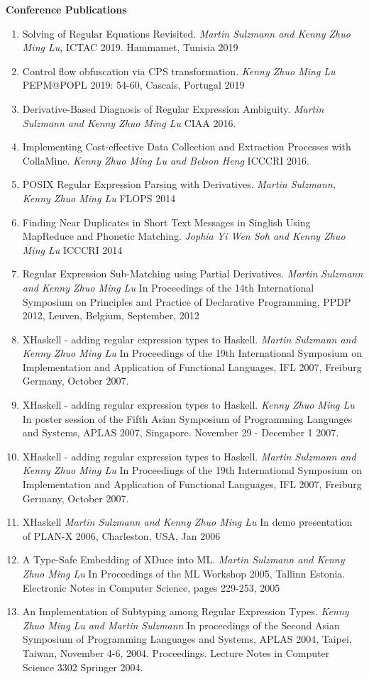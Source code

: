 \documentclass[margin,line]{res}
\begin{document}
\begin{resume}
{{\bf Conference Publications}
\begin{enumerate}
\item  Solving of Regular Equations Revisited. \textit{Martin Sulzmann
    and Kenny Zhuo Ming Lu}, ICTAC 2019. Hammamet, Tunisia 2019  
\item Control flow obfuscation via CPS transformation. \textit{Kenny
    Zhuo Ming Lu}  PEPM@POPL 2019: 54-60, Cascais, Portugal 2019 
\item Derivative-Based Diagnosis of Regular Expression
  Ambiguity. \textit{Martin Sulzmann and Kenny Zhuo Ming Lu} CIAA 2016.
\item Implementing Cost-effective Data Collection and Extraction
  Processes with CollaMine. \textit{Kenny Zhuo Ming Lu and Belson
    Heng} ICCCRI 2016.
\item POSIX Regular Expression Parsing with Derivatives. \textit{Martin Sulzmann, Kenny Zhuo Ming Lu}  FLOPS 2014  
\item Finding Near Duplicates in Short Text Messages in Singlish Using
  MapReduce and Phonetic Matching. \textit{ Jophia Yi Wen Soh and
    Kenny Zhuo Ming Lu} ICCCRI 2014
\item Regular Expression Sub-Matching using Partial Derivatives. \textit{Martin Sulzmann and Kenny Zhuo Ming Lu} 
In Proceedings of the 14th International Symposium on Principles and Practice of Declarative Programming, PPDP 2012, Leuven, Belgium, September, 2012
\item XHaskell - adding regular expression types to Haskell. \textit{Martin Sulzmann and Kenny Zhuo Ming Lu} 
In Proceedings of the 19th International Symposium on Implementation and Application of Functional Languages, IFL 2007, Freiburg Germany, October 2007.
\item XHaskell - adding regular expression types to Haskell. \textit{Kenny Zhuo Ming Lu} 
In poster session of the Fifth Asian Symposium of Programming Languages and Systems, APLAS 2007,
Singapore. November 29 - December 1 2007.
\item XHaskell - adding regular expression types to Haskell. \textit{Martin Sulzmann and Kenny Zhuo Ming Lu} 
In Proceedings of the 19th International Symposium on Implementation and Application of Functional Languages, IFL 2007, Freiburg Germany, October 2007.
\item XHaskell \textit{Martin Sulzmann and Kenny Zhuo Ming Lu} 
In demo presentation of PLAN-X 2006, Charleston, USA, Jan 2006
\item A Type-Safe Embedding of XDuce into ML. \textit{Martin Sulzmann and Kenny Zhuo Ming Lu} In Proceedings of
the ML Workshop 2005, Tallinn Estonia. Electronic Notes in Computer Science, pages 229-253, 2005 
\item An Implementation of Subtyping among Regular Expression Types. \textit{Kenny Zhuo Ming Lu and Martin Sulzmann} In proceedings of the Second Asian Symposium of Programming Languages and Systems, APLAS 2004, Taipei, Taiwan, November 4-6, 2004. Proceedings. Lecture Notes in Computer Science 3302 Springer 2004.
\end{enumerate}


}
\end{resume}
\end{document}
